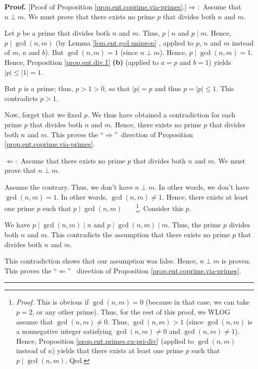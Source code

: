 \documentclass[numbers=enddot,12pt,final,onecolumn,notitlepage]{scrartcl}%
\numberwithin{exer}{subsection}
\theoremstyle{definition}
\newenvironment{proof}[1][Proof]{\noindent\textbf{#1.} }{\ \rule{0.5em}{0.5em}}
\begin{document}
\begin{proof}
[Proof of Proposition \ref{prop.ent.coprime.via-primes}.]$\Longrightarrow:$
Assume that $n\perp m$. We must prove that there exists no prime $p$ that
divides both $n$ and $m$.

Let $p$ be a prime that divides both $n$ and $m$. Thus, $p\mid n$ and $p\mid
m$. Hence, $p\mid\gcd\left(  n,m\right)  $ (by Lemma \ref{lem.ent.gcd.uniprop}%
, applied to $p$, $n$ and $m$ instead of $m$, $a$ and $b$). But $\gcd\left(
n,m\right)  =1$ (since $n\perp m$). Hence, $p\mid\gcd\left(  n,m\right)  =1$.
Hence, Proposition \ref{prop.ent.div.1} \textbf{(b)} (applied to $a=p$ and
$b=1$) yields $\left\vert p\right\vert \leq\left\vert 1\right\vert =1$.

But $p$ is a prime; thus, $p>1>0$, so that $\left\vert p\right\vert =p$ and
thus $p=\left\vert p\right\vert \leq1$. This contradicts $p>1$.

Now, forget that we fixed $p$. We thus have obtained a contradiction for each
prime $p$ that divides both $n$ and $m$. Hence, there exists no prime $p$ that
divides both $n$ and $m$. This proves the \textquotedblleft$\Longrightarrow
$\textquotedblright\ direction of Proposition
\ref{prop.ent.coprime.via-primes}.

$\Longleftarrow:$ Assume that there exists no prime $p$ that divides both $n$
and $m$. We must prove that $n\perp m$.

Assume the contrary. Thus, we don't have $n\perp m$. In other words, we don't
have $\gcd\left(  n,m\right)  =1$. In other words, $\gcd\left(  n,m\right)
\neq1$. Hence, there exists at least one prime $p$ such that $p\mid\gcd\left(
n,m\right)  $\ \ \ \ \footnote{\textit{Proof.} This is obvious if $\gcd\left(
n,m\right)  =0$ (because in that case, we can take $p=2$, or any other prime).
Thus, for the rest of this proof, we WLOG assume that $\gcd\left(  n,m\right)
\neq0$. Thus, $\gcd\left(  n,m\right)  >1$ (since $\gcd\left(  n,m\right)  $
is a nonnegative integer satisfying $\gcd\left(  n,m\right)  \neq0$ and
$\gcd\left(  n,m\right)  \neq1$). Hence, Proposition
\ref{prop.ent.primes.ex-pri-div} (applied to $\gcd\left(  n,m\right)  $
instead of $n$) yields that there exists at least one prime $p$ such that
$p\mid\gcd\left(  n,m\right)  $. Qed.}. Consider this $p$.

We have $p\mid\gcd\left(  n,m\right)  \mid n$ and $p\mid\gcd\left(
n,m\right)  \mid m$. Thus, the prime $p$ divides both $n$ and $m$. This
contradicts the assumption that there exists no prime $p$ that divides both
$n$ and $m$.

This contradiction shows that our assumption was false. Hence, $n\perp m$ is
proven. This proves the \textquotedblleft$\Longleftarrow$\textquotedblright%
\ direction of Proposition \ref{prop.ent.coprime.via-primes}.
\end{proof}
\end{document}
